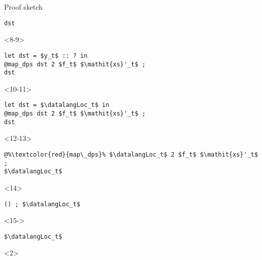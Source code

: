 \begin{frame}[fragile]{Proof sketch}
\begin{minipage}{.4\columnwidth}
\begin{onlyenv}
\begin{lstlisting}
dst
        \end{lstlisting}
    \end{onlyenv}
    \begin{onlyenv}<8-9>
        \begin{lstlisting}
let dst = $y_t$ :: ? in
@map_dps dst 2 $f_t$ $\mathit{xs}'_t$ ;
dst
        \end{lstlisting}
    \end{onlyenv}
    \begin{onlyenv}<10-11>
        \begin{lstlisting}
let dst = $\datalangLoc_t$ in
@map_dps dst 2 $f_t$ $\mathit{xs}'_t$ ;
dst
        \end{lstlisting}
    \end{onlyenv}
    \begin{onlyenv}<12-13>
        \begin{lstlisting}
@%\textcolor{red}{map\_dps}% $\datalangLoc_t$ 2 $f_t$ $\mathit{xs}'_t$ ;
$\datalangLoc_t$
        \end{lstlisting}
    \end{onlyenv}
    \begin{onlyenv}<14>
        \begin{lstlisting}
() ; $\datalangLoc_t$
        \end{lstlisting}
    \end{onlyenv}
    \begin{onlyenv}<15->
        \begin{lstlisting}
$\datalangLoc_t$
        \end{lstlisting}
    \end{onlyenv}
\end{minipage}
\begin{overbox}<2>
    \begin{mathpar}
\end{mathpar}
\end{overbox}
\end{frame}
